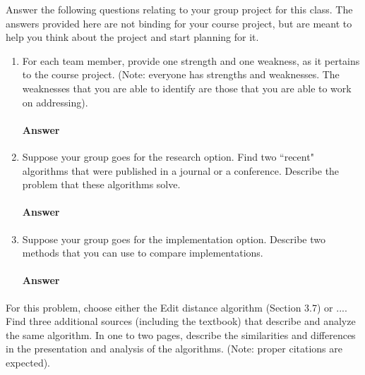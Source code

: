 \documentclass{article}
\begin{document}
Answer the following questions relating to your group project for this class.
The answers provided here are not binding for your course project, but are meant
to help you think about the project and start planning for it.

\begin{enumerate}

    \item For each team member, provide one strength and one weakness, as it
        pertains to the course project.  (Note: everyone has strengths and
        weaknesses.  The weaknesses that you are able to identify are those that
        you are able to work on addressing).

        \paragraph{Answer}
        \todo{}

    \item Suppose your group goes for the research option.  Find two ``recent"
        algorithms that were published in a journal or a conference.  Describe
        the problem that these algorithms solve.

        \paragraph{Answer}
        \todo{}

    \item Suppose your group goes for the implementation option. Describe two
        methods that you can use to compare implementations.

        \paragraph{Answer}
        \todo{}

\end{enumerate}


\collab{\todo{}}

For this problem, choose either the Edit distance algorithm (Section 3.7) or ....
Find three additional sources (including the
textbook) that describe
and analyze the same algorithm. In one to two pages, describe the similarities
and differences in the presentation and analysis of the algorithms. (Note:
proper citations are expected).
\end{document}
